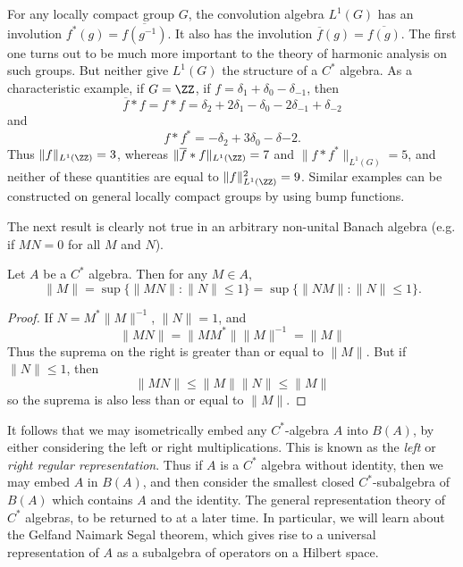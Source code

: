 \begin{example}
    For any locally compact group $G$, the convolution algebra $L^1(G)$ has an involution $f^*(g) = \overline{f(g^{-1})}$. It also has the involution $\overline{f}(g) = \overline{f(g)}$. The first one turns out to be much more important to the theory of harmonic analysis on such groups. But neither give $L^1(G)$ the structure of a $C^*$ algebra. As a characteristic example, if $G = \ZZ$, if $f = \delta_1 + \delta_0 - \delta_{-1}$, then
    \[ \overline{f} * f = f * f = \delta_2 + 2 \delta_1 - \delta_0 - 2 \delta_{-1} + \delta_{-2} \]
    and
    \[ f * f^* = - \delta_2 + 3 \delta_0 - \delta{-2}. \]
    Thus $\| f \|_{L^1(\ZZ)} = 3$, whereas $\| \overline{f} * f \|_{L^1(\ZZ)} = 7$ and $\| f * f^* \|_{L^1(G)} = 5$, and neither of these quantities are equal to $\| f \|_{L^1(\ZZ)}^2 = 9$. Similar examples can be constructed on general locally compact groups by using bump functions.
\end{example}

The next result is clearly not true in an arbitrary non-unital Banach algebra (e.g. if $MN = 0$ for all $M$ and $N$).

\begin{prop}
    Let $A$ be a $C^*$ algebra. Then for any $M \in A$,
    \[ \| M \| = \sup \{ \| MN \| : \| N \| \leq 1 \} = \sup \{ \| NM \| : \| N \| \leq 1 \}. \]
\end{prop}
\begin{proof}
    If $N = M^* \|M\|^{-1}$, $\| N \| = 1$, and
    \[ \| MN \| = \| MM^* \| \| M \|^{-1} = \| M \| \]
    Thus the suprema on the right is greater than or equal to $\| M \|$. But if $\| N \| \leq 1$, then
    \[ \| MN \| \leq \| M \| \| N \| \leq \| M \| \]
    so the suprema is also less than or equal to $\| M \|$.
\end{proof}

It follows that we may isometrically embed any $C^*$-algebra $A$ into $B(A)$, by either considering the left or right multiplications. This is known as the \emph{left} or \emph{right regular representation}. Thus if $A$ is a $C^*$ algebra without identity, then we may embed $A$ in $B(A)$, and then consider the smallest closed $C^*$-subalgebra of $B(A)$ which contains $A$ and the identity. The general representation theory of $C^*$ algebras, to be returned to at a later time. In particular, we will learn about the Gelfand Naimark Segal theorem, which gives rise to a universal representation of $A$ as a subalgebra of operators on a Hilbert space.

